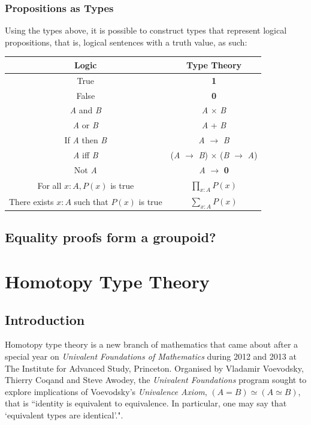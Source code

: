 \documentclass[12pt]{report}
\begin{document}
\subsection{Propositions as Types}
Using the types above, it is possible to construct types that represent logical propositions, that is, logical sentences with a truth value, as such:
\begin{center}
\begin{tabular}{|c|c|}
\hline 
\textbf{Logic} & \textbf{Type Theory} \\ 
\hline
True & \textbf{1} \\ 

False & \textbf{0} \\ 

\textit{A} and \textit{B} & \textit{A} $\times$ \textit{B} \\ 

\textit{A} or \textit{B} & \textit{A} + \textit{B} \\ 

If \textit{A} then \textit{B} & \textit{A} $ \rightarrow $ \textit{B} \\  

\textit{A} iff \textit{B} & (\textit{A} $ \rightarrow $ \textit{B}) $\times$ (\textit{B} $\rightarrow$ \textit{A})  \\ 

Not \textit{A} & \textit{A} $ \rightarrow $ \textbf{0} \\ 

For all $ x : A, P(x)$ is true & $\prod_{x : A}P(x)$\\

There exists $ x : A$ such that $P(x)$ is true & $\sum_{x : A}P(x)$\\

\hline 
\end{tabular} 
\end{center} 
\section{Equality proofs form a groupoid?}


\chapter{Homotopy Type Theory}
\section{Introduction}
Homotopy type theory is a new branch of mathematics that came about after a special year on \textit{Univalent Foundations of Mathematics} during 2012 and 2013 at The Institute for Advanced Study, Princeton. Organised by Vladamir Voevodsky, Thierry Coqand and Steve Awodey, the \textit{Univalent Foundations} program sought to explore implications of Voevodsky's \textit{Univalence Axiom}, $(A = B) \simeq (A \simeq B)$, that is ``identity is equivalent to equivalence. In particular, one may say that `equivalent types are identical'."\cite{hott}.
\end{document}
